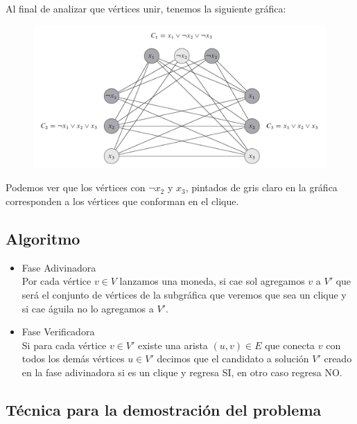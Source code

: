 \documentclass[a4paper]{article}
\begin{document}
Al final de analizar que vértices unir, tenemos la siguiente gráfica:

\begin{figure}[H]
    \includegraphics[scale=0.75]{imgs/clique.png}
\end{figure}

Podemos ver que los vértices con $\neg x_2$ y $x_3$, pintados de gris claro en la gráfica corresponden a los vértices que conforman en el clique.

\newpage
\subsection{Algoritmo}

\begin{itemize}
    \item Fase Adivinadora\\

    Por cada vértice $v\in V$ lanzamos una moneda, si cae sol agregamos $v$ a $V'$ que será el conjunto de vértices de la subgráfica que veremos que sea un clique y si cae águila no lo agregamos a $V'$.
    
    \item Fase Verificadora\\

    Si para cada vértice $v \in V'$ existe una arista $(u,v) \in E$ que conecta $v$ con todos los demás vértices $u \in V'$ decimos que el candidato a solución $V'$ creado en la fase adivinadora si es un clique y regresa SI, en otro caso regresa NO. 
    
\end{itemize}

\subsection{Técnica para la demostración del problema}
\end{document}
